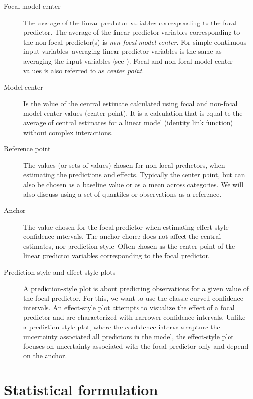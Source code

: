 \begin{description}
\item [Focal model center] The average of the linear predictor variables corresponding to the focal predictor. The average of the linear predictor variables corresponding to the non-focal predictor(s) is \emph{non-focal model center}. For simple continuous input variables, averaging linear predictor variables is the same as averaging the input variables (see ). Focal and non-focal model center values is also referred to as \emph{center point}. 

\item [Model center] Is the value of the central estimate calculated using focal and non-focal model center values (center point). It is a calculation that is equal to the average of central estimates for a linear model (identity link function) without complex interactions. 

\item [Reference point] The values (or sets of values) chosen for non-focal predictors, when estimating the predictions and effects. Typically the center point, but can also be chosen as a baseline value or as a mean across categories. We will also discuss using a set of quantiles or observations as a reference.

\item [Anchor] The value chosen for the focal predictor when estimating effect-style confidence intervals. The anchor choice does not affect the central estimates, nor prediction-style. Often chosen as the center point of the linear predictor variables corresponding to the focal predictor. 

\item [Prediction-style and effect-style plots] A prediction-style plot is about predicting observations for a given value of the focal predictor. For this, we want to use the classic curved confidence intervals. An effect-style plot attempts to visualize the effect of a focal predictor and are characterized with narrower confidence intervals. Unlike a prediction-style plot, where the confidence intervals capture the uncertainty associated all predictors in the model, the effect-style plot focuses on uncertainty associated with the focal predictor only and depend on the anchor.

\end{description}

\section{Statistical formulation}


